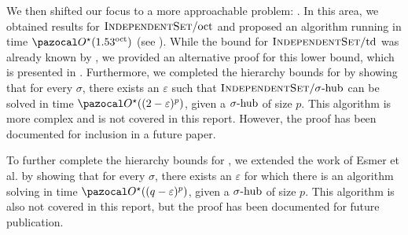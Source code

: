 \medskip

We then shifted our focus to a more approachable problem: . In this area, we obtained results for $\textsc{IndependentSet}/\text{oct}$ and proposed an algorithm running in time $\O^\star(1.53^\oct)$ (see ). While the bound for $\textsc{IndependentSet}/\text{td}$ was already known by , we provided an alternative proof for this lower bound, which is presented in . Furthermore, we completed the hierarchy bounds for  by showing that for every $\sigma$, there exists an $\varepsilon$ such that $\textsc{IndependentSet}/\sigma\text{-hub}$ can be solved in time $\O^\star((2- \varepsilon)^p)$, given a $\sigma\text{-hub}$ of size $p$. This algorithm is more complex and is not covered in this report. However, the proof has been documented for inclusion in a future paper.

\medskip

To further complete the hierarchy bounds for , we extended the work of Esmer et al. by showing that for every $\sigma$, there exists an $\varepsilon$ for which there is an algorithm solving  in time $\O^\star((q-\varepsilon)^p)$, given a $\sigma\text{-hub}$ of size $p$. This algorithm is also not covered in this report, but the proof has been documented for future publication.